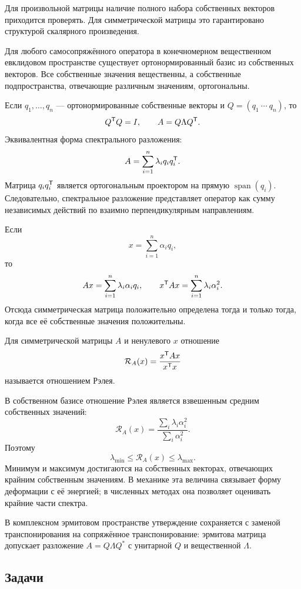 Для произвольной матрицы наличие полного набора собственных векторов приходится проверять. Для симметрической матрицы это гарантировано структурой скалярного произведения.

\begin{theorem}
Для любого самосопряжённого оператора в конечномерном вещественном евклидовом пространстве существует ортонормированный базис из собственных векторов. Все собственные значения вещественны, а собственные подпространства, отвечающие различным значениям, ортогональны.
\end{theorem}

Если $q_1,\dots,q_n$ --- ортонормированные собственные векторы и $Q=(q_1\ \cdots\ q_n)$, то
\[
Q^{\mathsf{T}}Q=I,
\qquad
A=Q\Lambda Q^{\mathsf{T}}.
\]
Эквивалентная форма спектрального разложения:
\[
A=\sum_{i=1}^{n}\lambda_i q_iq_i^{\mathsf{T}}.
\]
Матрица $q_iq_i^{\mathsf{T}}$ является ортогональным проектором на прямую $\operatorname{span}(q_i)$. Следовательно, спектральное разложение представляет оператор как сумму независимых действий по взаимно перпендикулярным направлениям.

Если
\[
x=\sum_{i=1}^{n}\alpha_iq_i,
\]
то
\[
Ax=\sum_{i=1}^{n}\lambda_i\alpha_iq_i,
\qquad
x^{\mathsf{T}}Ax=\sum_{i=1}^{n}\lambda_i\alpha_i^2.
\]
Отсюда симметрическая матрица положительно определена тогда и только тогда, когда все её собственные значения положительны.

\begin{definition}
Для симметрической матрицы $A$ и ненулевого $x$ отношение
\[
\mathcal{R}_A(x)=\frac{x^{\mathsf{T}}Ax}{x^{\mathsf{T}}x}
\]
называется отношением Рэлея.
\end{definition}

В собственном базисе отношение Рэлея является взвешенным средним собственных значений:
\[
\mathcal{R}_A(x)
=
\frac{\sum_i\lambda_i\alpha_i^2}{\sum_i\alpha_i^2}.
\]
Поэтому
\[
\lambda_{\min}\leq \mathcal{R}_A(x)\leq \lambda_{\max}.
\]
Минимум и максимум достигаются на собственных векторах, отвечающих крайним собственным значениям. В механике эта величина связывает форму деформации с её энергией; в численных методах она позволяет оценивать крайние части спектра.

В комплексном эрмитовом пространстве утверждение сохраняется с заменой транспонирования на сопряжённое транспонирование: эрмитова матрица допускает разложение $A=Q\Lambda Q^*$ с унитарной $Q$ и вещественной $\Lambda$.

\subsection*{Задачи}

